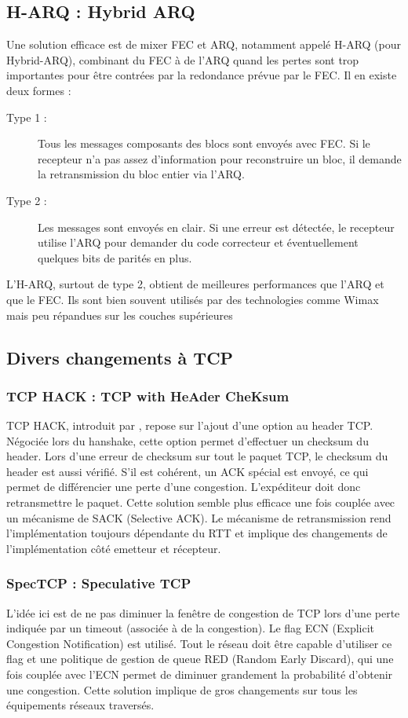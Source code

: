 \documentclass[frenchb]{article}
\begin{document}
\subsection{H-ARQ : Hybrid ARQ}
Une solution efficace est de mixer FEC et ARQ, notamment appelé H-ARQ (pour Hybrid-ARQ), combinant du FEC à de l'ARQ quand les pertes sont trop importantes pour être contrées par la redondance prévue par le FEC.
Il en existe deux formes :
\begin{description}
\item[Type 1 :] Tous les messages composants des blocs sont envoyés avec FEC. Si le recepteur n'a pas assez d'information pour reconstruire un bloc, il demande la retransmission du bloc entier via l'ARQ.
\item[Type 2 :] Les messages sont envoyés en clair. Si une erreur est détectée, le recepteur utilise l'ARQ pour demander du code correcteur et éventuellement quelques bits de parités en plus.
\end{description}
L'H-ARQ, surtout de type 2, obtient de meilleures performances que l'ARQ et que le FEC. Ils sont bien souvent utilisés par des technologies comme Wimax mais peu répandues sur les couches supérieures


\subsection{Divers changements à TCP}
\subsubsection{TCP HACK : TCP with HeAder CheKsum}
TCP HACK, introduit par \cite{tcphack}, repose sur l'ajout d'une option au header TCP. Négociée lors du hanshake, cette option permet d'effectuer un checksum du header. Lors d'une erreur de checksum sur tout le paquet TCP, le checksum du header est aussi vérifié. S'il est cohérent, un ACK spécial est envoyé, ce qui permet de différencier une perte d'une congestion. L'expéditeur doit donc retransmettre le paquet. Cette solution semble plus efficace une fois couplée avec un mécanisme de SACK (Selective ACK). Le mécanisme de retransmission rend l'implémentation toujours dépendante du RTT et implique des changements de l'implémentation côté emetteur et récepteur.


\subsubsection{SpecTCP : Speculative TCP}
L'idée ici est de ne pas diminuer la fenêtre de congestion de TCP lors d'une perte indiquée par un timeout (associée à de la congestion). Le flag ECN (Explicit Congestion Notification) est utilisé. Tout le réseau doit être capable d'utiliser ce flag et une politique de gestion de queue RED (Random Early Discard), qui une fois couplée avec l'ECN permet de diminuer grandement la probabilité d'obtenir une congestion. Cette solution implique de gros changements sur tous les équipements réseaux traversés.
\end{document}

